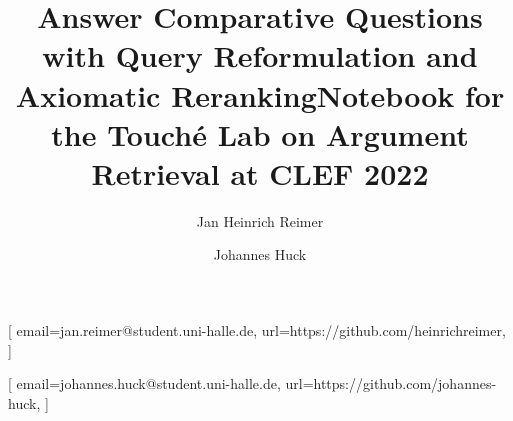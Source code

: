 \documentclass[
]{ceurart}
\begin{document}


\title{Answer Comparative Questions with Query Reformulation and Axiomatic Reranking}
\title[mode=sub]{Notebook for the Touch{\'e} Lab on Argument Retrieval at CLEF 2022}

\author[1]{Jan Heinrich Reimer}[%
email=jan.reimer@student.uni-halle.de,
url=https://github.com/heinrichreimer,
]
\address[1]{Martin-Luther-University Halle-Wittenberg,
Universitätsplatz 10, Halle, 06108, Germany}

\author[1]{Johannes Huck}[%
email=johannes.huck@student.uni-halle.de,
url=https://github.com/johannes-huck,
]



\maketitle







\nocite{*}

\end{document}
